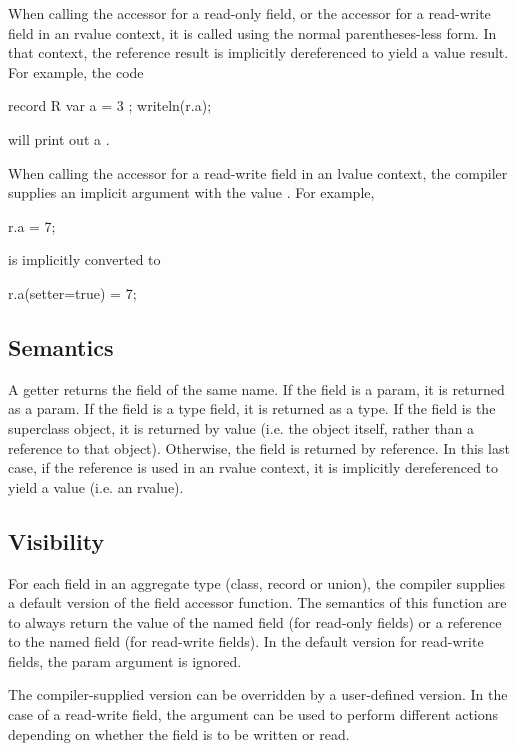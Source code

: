 When calling the accessor for a read-only field, or the accessor for a read-write field in
an rvalue context, it is called using the normal parentheses-less form.  In that context,
the reference result is implicitly dereferenced to yield a value result.  For example, the
code
\begin{chapel}
record R { var a = 3 ; }
writeln(r.a);
\end{chapel}
\noindent
will print out a .

When calling the accessor for a read-write field in an lvalue context, the compiler
supplies an implicit  argument with the value .  For example,
\begin{chapel}
r.a = 7;
\end{chapel}
\noindent
is implicitly converted to
\begin{chapel}
r.a(setter=true) = 7;
\end{chapel}

\subsection{Semantics}

A getter returns the field of the same name.  If the field is a param, it is
returned as a param.  If the field is a type field, it is returned as a type.
If the field is the superclass object, it is returned by value (i.e. the object
itself, rather than a reference to that object).  Otherwise, the field is
returned by reference.  In this last case, if the reference is used in an rvalue context,
it is implicitly dereferenced to yield a value (i.e. an rvalue).

\subsection{Visibility}

For each field in an aggregate type (class, record or union), the compiler supplies a
default version of the field accessor function.  The semantics of this function are to
always return the value of the named field (for read-only fields) or a reference to the
named field (for read-write fields).  In the default version for read-write fields,
the  param argument is ignored.

The compiler-supplied version can be overridden by a user-defined version.  In the case of
a read-write field, the  argument can be used to perform different actions
depending on whether the field is to be written or read.

